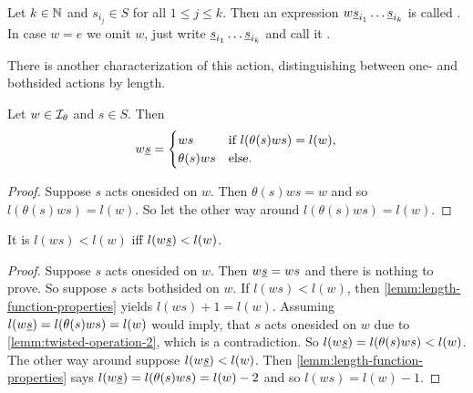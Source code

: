 \begin{defi}
	Let $k \in \mathbb{N}$ and $s_{i_j} \in S$ for all $1 \leq j \leq k$. Then an expression $w \underline{s}_{i_1} \ldots \underline{s}_{i_k}$ is called . In case $w = e$ we omit $w$, just write $\underline{s}_{i_1} \ldots \underline{s}_{i_k}$ and call it .
\end{defi}

There is another characterization of this action, distinguishing between one- and bothsided actions by length.

\begin{lemm}
	Let $w \in \mathcal{I}_{\theta}$ and $s \in S$. Then
	$$ w \underline{s} = \begin{cases}
		ws & \textrm{if } l(\theta(s)ws) = l(w), \\
		\theta(s)ws & \textrm{else}. \\
	\end{cases} $$

	\begin{proof}
		Suppose $s$ acts onesided on $w$. Then $\theta(s)ws = w$ and so $l(\theta(s)ws) = l(w)$. So let the other way around $l(\theta(s)ws) = l(w)$. \todo
	\end{proof}
\end{lemm}

\begin{lemm}
	It is $l(ws) < l(w)$ iff $l(w \underline{s}) < l(w)$.

	\begin{proof}
		Suppose $s$ acts onesided on $w$. Then $w \underline{s} = ws$ and there is nothing to prove. So suppose $s$ acts bothsided on $w$. If $l(ws) < l(w)$, then \ref{lemm:length-function-properties} yields $l(ws) + 1 = l(w)$. Assuming $l(w \underline{s}) = l(\theta(s)ws) = l(w)$ would imply, that $s$ acts onesided on $w$ due to \ref{lemm:twisted-operation-2}, which is a contradiction. So $l(w \underline{s}) = l(\theta(s)ws) < l(w)$. The other way around suppose $l(w \underline{s}) < l(w)$. Then \ref{lemm:length-function-properties} says $l(w \underline{s}) = l(\theta(s)ws) = l(w) - 2$ and so $l(ws) = l(w) - 1$.
	\end{proof}
\end{lemm}

